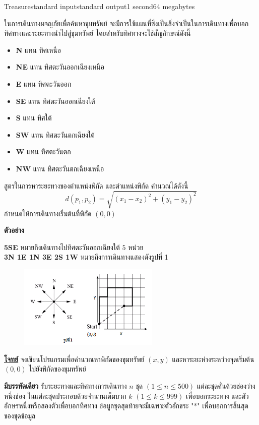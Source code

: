 \documentclass[11pt,a4paper]{article}
\begin{document}
\begin{problem}{Treasure}{standard input}{standard output}{1 second}{64 megabytes}

ในการเดินทางผจญภัยเพื่อค้นหาขุมทรัพย์ จะมีการใช้แผนที่ซึ่งเป็นสิ่งจำเป็นในการเดินทางเพื่อบอกทิศทางและระยะทางนำไปสู่ขุมทรัพย์ โดยสำหรับทิศทางจะใช้สัญลักษณ์ดังนี้
\begin{itemize}

\item \textbf{N }แทน ทิศเหนือ
\item \textbf{NE} แทน ทิศตะวันออกเฉียงเหนือ
\item \textbf{E} แทน ทิศตะวันออก
\item \textbf{SE} แทน ทิศตะวันออกเฉียงใต้
\item \textbf{S} แทน ทิศใต้
\item \textbf{SW} แทน ทิศตะวันตกเฉียงใต้
\item \textbf{W} แทน ทิศตะวันตก
\item \textbf{NW} แทน ทิศตะวันตกเฉียงเหนือ
\end{itemize}

สูตรในการหาระยะทางของตำแหน่งพิกัด และตำแหน่งพิกัด คำนวณได้ดังนี้
$$d(p_1,p_2) = \sqrt{(x_1-x_2)^2 + (y_1 - y_2)^2}$$
กำหนดให้การเดินทางเริ่มต้นที่พิกัด $(0, 0)$
\bigskip

\textbf{ตัวอย่าง}

\textbf{5SE} หมายถึงเดินทางไปทิศตะวันออกเฉียงใต้ $5$ หน่วย\\ \textbf{3N 1E 1N 3E 2S 1W} หมายถึงการเดินทางแสดงดังรูปที่ 1

\begin{figure}[h]
\centering
\includegraphics[width=0.6\textwidth]{../latex/img/1016/1016-2.png}
\end{figure}

\underline{\textbf{โจทย์}}  จงเขียนโปรแกรมเพื่อคำนวณหาพิกัดของขุมทรัพย์ $(x, y)$ และหาระยะห่างระหว่างจุดเริ่มต้น $(0,0)$ ไปยังพิกัดของขุมทรัพย์

\InputFile

\textbf{มีบรรทัดเดียว} รับระยะทางและทิศทางการเดินทาง $n$ ชุด $(1\leq n\leq 500)$ แต่ละชุดคั่นด้วยช่องว่างหนึ่งช่อง ในแต่ละชุดประกอบด้วยจำนวนเต็มบวก $k$ $(1\leq k\leq 999)$ เพื่อบอกระยะทาง และตัวอักษรหนึ่งหรือสองตัวเพื่อบอกทิศทาง ข้อมูลชุดสุดท้ายจะมีเฉพาะตัวอักขระ "*" เพื่อบอกการสิ้นสุดของชุดข้อมูล


\end{problem}
\end{document}
